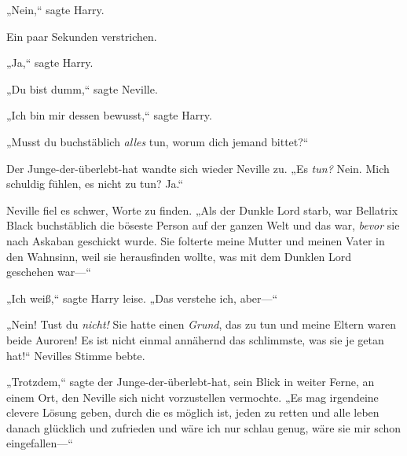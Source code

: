 „Nein,“ sagte Harry.

Ein paar Sekunden verstrichen.

„Ja,“ sagte Harry.

„Du bist dumm,“ sagte Neville.

„Ich bin mir dessen bewusst,“ sagte Harry.

„Musst du buchstäblich \emph{alles} tun, worum dich jemand bittet?“

Der Junge-der-überlebt-hat wandte sich wieder Neville zu. „Es \emph{tun?} Nein. Mich schuldig fühlen, es nicht zu tun? Ja.“

Neville fiel es schwer, Worte zu finden. „Als der Dunkle Lord starb, war Bellatrix Black buchstäblich die böseste Person auf der ganzen Welt und das war, \emph{bevor} sie nach Askaban geschickt wurde. Sie folterte meine Mutter und meinen Vater in den Wahnsinn, weil sie herausfinden wollte, was mit dem Dunklen Lord geschehen war—“

„Ich weiß,“ sagte Harry leise. „Das verstehe ich, aber—“

„Nein! Tust du \emph{nicht!} Sie hatte einen \emph{Grund}, das zu tun und meine Eltern waren beide Auroren! Es ist nicht einmal annähernd das schlimmste, was sie je getan hat!“ Nevilles Stimme bebte.

„Trotzdem,“ sagte der Junge-der-überlebt-hat, sein Blick in weiter Ferne, an einem Ort, den Neville sich nicht vorzustellen vermochte. „Es mag irgendeine clevere Lösung geben, durch die es möglich ist, jeden zu retten und alle leben danach glücklich und zufrieden und wäre ich nur schlau genug, wäre sie mir schon eingefallen—“

